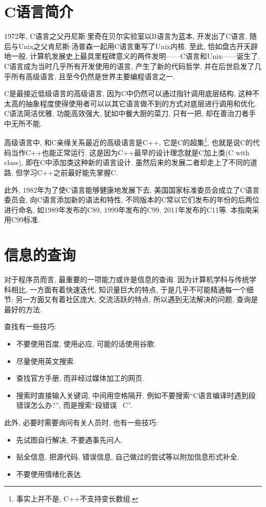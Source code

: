     \section{C语言简介} \label{C语言简介}
        1972年, C语言之父丹尼斯$\cdot$里奇在贝尔实验室以B语言为蓝本, 开发出了C语言, 随后与Unix之父肯尼斯$\cdot$汤普森一起用C语言重写了Unix内核. 至此, 恰如盘古开天辟地一般, 计算机发展史上最具里程碑意义的两件发明——C语言和Unix——诞生了. C语言成为当时几乎所有开发使用的语言, 产生了新的代码哲学, 并在后世启发了几乎所有高级语言, 且至今仍然是世界主要编程语言之一. 
        
        C是最接近低级语言的高级语言, 因为C中仍然可以通过指针调用底层结构, 这种不太高的抽象程度使得使用者可以以其它语言做不到的方式对底层进行调用和优化. C语法简洁优雅, 功能高效强大, 犹如中餐大厨的菜刀, 只有一把, 却在善治刀者手中无所不能.

        高级语言中, 和C亲缘关系最近的高级语言是C++, 它是C的超集\footnote{事实上并不是, C++不支持变长数组.}, 也就是说C的代码当作C++也能正常运行. 这是因为C++最早的设计理念就是C加上类(C with class), 即在C中添加类这种新的语言设计. 虽然后来的发展二者却走上了不同的道路, 但学习C++之前最好能先掌握C.

        此外, 1982年为了使C语言能够健康地发展下去, 美国国家标准委员会成立了C语言委员会, 向C语言添加新的语法和特性, 不同版本的C常以它们发布的年份的后两位进行命名, 如1989年发布的C89, 1999年发布的C99, 2011年发布的C11等. 本指南采用C99标准.

    \section{信息的查询} \label{信息的查询}
        对于程序员而言, 最重要的一项能力或许是信息的查询. 因为计算机学科与传统学科相比, 一方面有着快速迭代, 知识量巨大的特点, 于是几乎不可能精通每一个细节; 另一方面又有着社区庞大, 交流活跃的特点, 所以遇到无法解决的问题, 查询是最好的方法.

        查找有一些技巧:
        \vspace*{-13pt}
        \begin{itemize}
            \item 不要使用百度, 使用必应, 可能的话使用谷歌.
            \item 尽量使用英文搜索.
            \item 查找官方手册, 而非经过媒体加工的网页.
            \item 搜索时直接输入关键词, 中间用空格隔开. 例如不要搜索``C语言编译时遇到段错误怎么办?'', 而是搜索``段错误 \ C''.
        \end{itemize}

        此外, 必要时需要询问有关人员时, 也有一些技巧:
        \vspace*{-13pt}
        \begin{itemize}
            \item 先试图自行解决, 不要遇事先问人.
            \item 贴全信息. 把源代码, 错误信息, 自己做过的尝试等以附加信息形式补全.
            \item 不要使用情绪化表达. 
        \end{itemize}